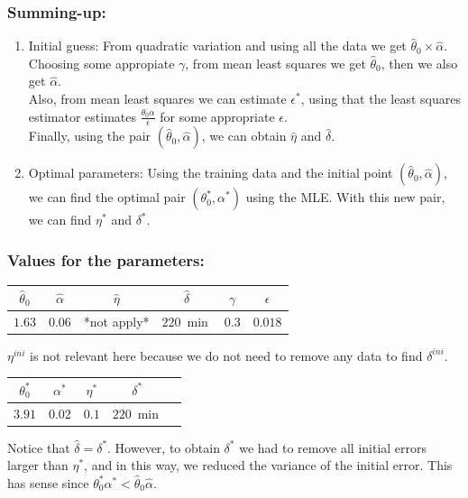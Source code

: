 \documentclass[aspectratio=169]{beamer}\usepackage[utf8]{inputenc}
\begin{document}
\begin{frame}\frametitle{Summing-up:}

\begin{enumerate}

\item Initial guess: From quadratic variation and using all the data we get $\hat{\theta}_0\times\hat{\alpha}$. Choosing some appropiate $\gamma$, from mean least squares we get $\hat{\theta}_0$, then we also get $\hat{\alpha}$.\\
Also, from mean least squares we can estimate $\epsilon^*$, using that the least squares estimator estimates $\frac{\theta_0\alpha}{\epsilon}$ for some appropriate $\epsilon$.\\
Finally, using the pair $(\hat{\theta}_0,\hat{\alpha})$, we can obtain $\hat{\eta}$ and $\hat{\delta}$.

\item Optimal parameters: Using the training data and the initial point $(\hat{\theta}_0,\hat{\alpha})$, we can find the optimal pair $(\theta_0^*,\alpha^*)$ using the MLE. With this new pair, we can find $\eta^*$ and $\delta^*$.

\end{enumerate}

\end{frame}


\begin{frame}\frametitle{Values for the parameters:}

\begin{table}[]
\begin{tabular}{cccccc}
\toprule
$\hat{\theta}_0$ & $\hat{\alpha}$ & $\hat{\eta}$ & $\hat{\delta}$ & $\gamma$ & $\epsilon$ \\
\midrule
$1.63$ & $0.06$ & *not apply* & $\SI{220}{\min}$ & $0.3$ & $0.018$ \\
\bottomrule
\end{tabular}
\end{table}
$\eta^{ini}$ is not relevant here because we do not need to remove any data to find $\delta^{ini}$.
\begin{table}[]
\begin{tabular}{ccccc}
\toprule
$\theta_0^{*}$ & $\alpha^{*}$ & $\eta^{*}$ & $\delta^{*}$ \\
\midrule
$3.91$ & $0.02$ & $0.1$ & $\SI{220}{\min}$ \\
\bottomrule
\end{tabular}
\end{table}
Notice that $\hat{\delta}=\delta^*$. However, to obtain $\delta^*$ we had to remove all initial errors larger than $\eta^*$, and in this way, we reduced the variance of the initial error. This has sense since $\theta^*_0\alpha^*<\hat{\theta}_0\hat{\alpha}$.

\end{frame}
\end{document}
